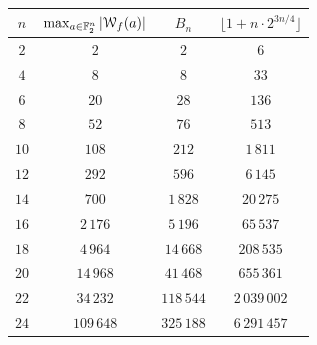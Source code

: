 \documentclass[11pt]{llncs}
\begin{document}
\begin{table}[ht]
	\small
	\centering
	\begin{tabular}{|c|c|c|c|}
		\hline
		$n$ & $\max_{a\in\mathbb{F}_2^n}|\mathcal W_{f}(a)|$ & $B_n$  & $\lfloor 1+n \cdot 2^{3n/4} \rfloor$\\ \hline
		$2$  & $2$     & $2$  &  $6$ \\
		$4$  & $8$     & $8$  & $33$  \\
		$6$  & $20$    & $28$   & $136$\\
		$8$  & $52$    & $76$  & $513$ \\
		$10$ & $108$   & $212$  & $1\,811$\\
		$12$ & $292$   & $596$  & $6\,145$ \\
		$14$ & $700$   & $1\,828$ & $20\,275$ \\
		$16$ & $2\,176$  & $5\,196$ & $65\,537$ \\
		$18$ & $4\,964$  & $14\,668$ & $208\,535$ \\
		$20$ & $14\,968$ & $41\,468$ & $655\,361$ \\
		$22$ & $34\,232$ & $118\,544$ & $2\,039 \,002$ \\
		$24$ & $109\,648$ & $325\,188$ & $6\,291 \,457$  \\ \hline
	\end{tabular}
	\label{table:max_walsh_vs_bound}
\end{table}
\end{document}
